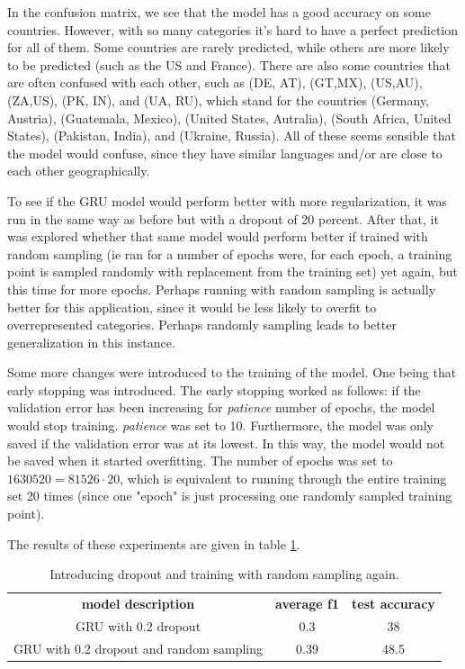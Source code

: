 \documentclass[runningheads]{llncs}
\begin{document}
In the confusion matrix, we see that the model has a good accuracy on some countries. However, with so many categories it's hard to have a perfect prediction for all of them. Some countries are rarely predicted, while others are more likely to be predicted (such as the US and France). There are also some countries that are often confused with each other, such as (DE, AT), (GT,MX), (US,AU),(ZA,US), (PK, IN), and (UA, RU), which stand for the countries (Germany, Austria), (Guatemala, Mexico), (United States, Autralia), (South Africa, United States), (Pakistan, India), and (Ukraine, Russia). All of these seems sensible that the model would confuse, since they have similar languages and/or are close to each other geographically.

To see if the GRU model would perform better with more regularization, it was run in the same way as before but with a dropout of 20 percent. After that, it was explored whether that same model would perform better if trained with random sampling (ie ran for a number of epochs were, for each epoch, a training point is sampled randomly with replacement from the training set) yet again, but this time for more epochs. Perhaps running with random sampling is actually better for this application, since it would be less likely to overfit to overrepresented categories. Perhaps randomly sampling leads to better generalization in this instance.

Some more changes were introduced to the training of the model. One being that early stopping was introduced. The early stopping worked as follows: if the validation error has been increasing for \textit{patience} number of epochs, the model would stop training. \textit{patience} was set to 10. Furthermore, the model was only saved if the validation error was at its lowest. In this way, the model would not be saved when it started overfitting. The number of epochs was set to $1630520 = 81526 \cdot 20$, which is equivalent to running through the entire training set 20 times (since one "epoch" is just processing one randomly sampled training point).

The results of these experiments are given in table \ref{tab:additonal}.

\begin{table}[h!]
    \begin{center}
        \caption{Introducing dropout and training with random sampling again.}
        \label{tab:additonal}
		\begin{tabularx}{.8\textwidth}{ | c | c | c |}
			\textbf{model description} & \textbf{average f1} & \textbf{test accuracy} \\
			GRU with 0.2 dropout & 0.3 & 38 \\
			GRU with 0.2 dropout and random sampling & 0.39 & 48.5  \\
		\end{tabularx}  
    \end{center}
\end{table}
\end{document}
